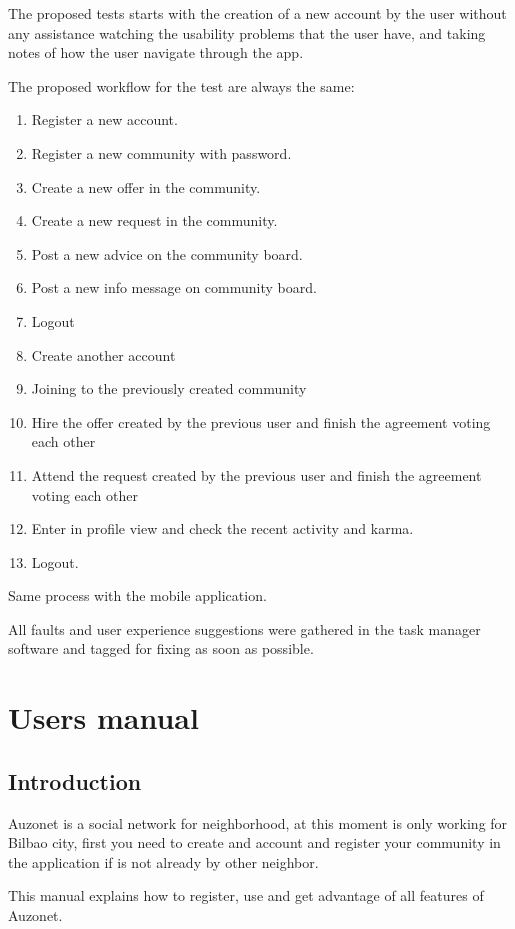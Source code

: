 \documentclass{DeustoFDP}
\begin{document}
The proposed tests starts with the creation of a new account by the user without any assistance watching the usability problems that the user have, and taking notes of how the user navigate through the app.

The proposed workflow for the test are always the same:

\begin{enumerate}
	\item Register a new account.
	\item Register a new community with password.
	\item Create a new offer in the community.
	\item Create a new request in the community.
	\item Post a new advice on the community board.
	\item Post a new info message on community board.
	\item Logout
	\item Create another account
	\item Joining to the previously created community
	\item Hire the offer created by the previous user and finish the agreement voting each other
	\item Attend the request created by the previous user and finish the agreement voting each other
	\item Enter in profile view and check the recent activity and karma.
	\item Logout.
\end{enumerate}

Same process with the mobile application.

All faults and user experience suggestions were gathered in the task manager software and tagged for fixing as soon as possible.

\chapter{Users manual}\label{usersmanual}
\section{Introduction}
Auzonet is a social network for neighborhood, at this moment is only working for Bilbao city, first you need to create and account and register your community in the application if is not already by other neighbor.

This manual explains how to register, use and get advantage of all features of Auzonet.
\end{document}
